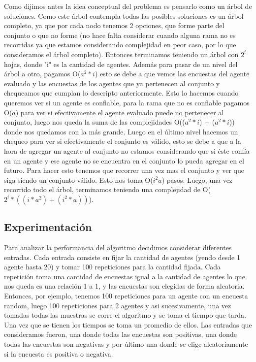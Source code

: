 	Como dijimos antes la idea conceptual del problema es pensarlo como un árbol de soluciones. Como este árbol contempla todas las posibles soluciones es un árbol completo, ya que por cada nodo tenemos 2 opciones, que forme parte del conjunto o que no forme (no hace falta considerar cuando alguna rama no es recorridas ya que estamos considerando complejidad en peor caso, por lo que  consideramos el árbol completo). Entonces terminamos teniendo un árbol con $2^{i}$ hojas, donde "i" es la cantidad de agentes. Además para pasar de un nivel del árbol a otro, pagamos O($a^{2}*i$) esto se debe a que vemos las encuestas del agente evaluado y las encuestas de los agentes que ya pertenecen al conjunto y chequeamos que cumplan lo descripto anteriormente. Esto lo hacemos cuando queremos ver si un agente es confiable, para la rama que no es confiable pagamos O($a$) para ver si efectivamente el agente evaluado puede no pertenecer al conjunto, luego nos queda la suma de las complejidades O(($a^{2}*i$) + ($a^{2}*i$)) donde nos quedamos con la más grande. Luego en el último nivel hacemos un chequeo para ver si efectivamente el conjunto es válido, esto se debe a que a la hora de agregar un agente al conjunto no estamos considerando que si éste confía en un agente y ese agente no se encuentra en el conjunto lo pueda agregar en el futuro. Para hacer esto tenemos que recorrer una vez mas el conjunto y ver que siga siendo un conjunto válido. Esto nos toma O($i^{2}a$) pasos. Luego, una vez recorrido todo el árbol, terminamos teniendo una complejidad de O($2^{i}*((i*a^{2})+(i^{2}*a))$).
	
\subsection{Experimentación} 
	
	Para analizar la performancia del algoritmo decidimos considerar diferentes entradas. Cada entrada consiste en fijar la cantidad de agentes (yendo desde 1 agente hasta 20) y tomar 100 repeticiones para la cantidad fijada. Cada repetición toma una cantidad de encuestas igual a la cantidad de agentes lo que nos queda es una relación 1 a 1, y las encuestas son elegidas de forma aleatoria. Entonces, por ejemplo, tenemos 100 repeticiones para un agente con un encuesta random, luego 100 repeticiones para 2 agentes y asi sucesivamente, una vez tomadas todas las muestras se corre el algoritmo y se toma el tiempo que tarda. Una vez que se tienen los tiempos se toma un promedio de ellos. Las entradas que consideramos fueron, una donde todas las encuestas son positivas, una donde todas las encuestas son negativas y por último una donde se elige aleatoriamente si la encuesta es positiva o negativa.       
	
